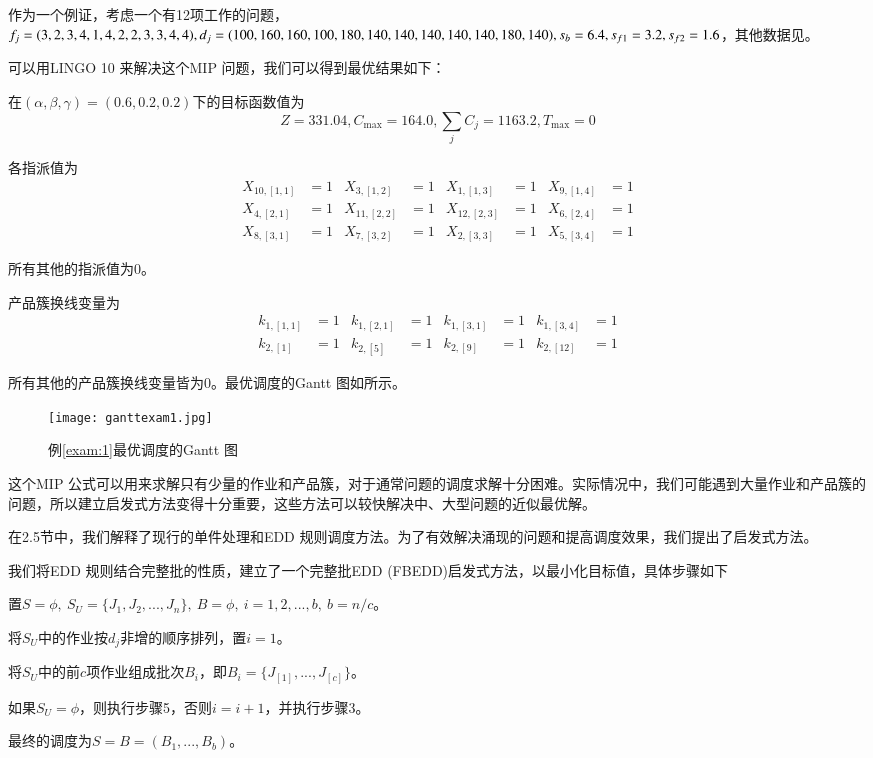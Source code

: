 \begin{example}
作为一个例证，考虑一个有12项工作的问题，$f_j=(3,2,3,4,1,4,2,2,3,3,4,4),d_j=(100,160,160,100,180,\\
140,140,140,140,140,180,140),s_b=6.4,s_{f1}=3.2,s_{f2}=1.6$，其他数据见。\label{exam:1}
\end{example}

可以用LINGO 10 来解决这个MIP 问题，我们可以得到最优结果如下：

在$(\alpha,\beta,\gamma) = (0.6,0.2,0.2)$下的目标函数值为
$$Z = 331.04, C_{\max} = 164.0, {\textstyle\sum_j C_j = 1163.2}, T_{\max} = 0$$

各指派值为
\begin{align*}
 X_{10,[1,1]} & = 1 & X_{3,[1,2]} & = 1 & X_{1,[1,3]} & = 1 & X_{9,[1,4]} & = 1\\
 X_{4,[2,1]} & = 1 & X_{11,[2,2]} & = 1 & X_{12,[2,3]} & = 1 & X_{6,[2,4]} & = 1\\
 X_{8,[3,1]} & = 1 & X_{7,[3,2]} & = 1 & X_{2,[3,3]} & = 1 & X_{5,[3,4]} & = 1
\end{align*}

所有其他的指派值为0。

产品簇换线变量为
\begin{align*}
k_{1,[1,1]} & = 1 & k_{1,[2,1]} & = 1 & k_{1,[3,1]} & = 1 & k_{1,[3,4]} & = 1 \\
k_{2,[1]} & = 1 & k_{2,[5]} & = 1 & k_{2,[9]} & = 1 & k_{2,[12]} & = 1
\end{align*}

所有其他的产品簇换线变量皆为0。最优调度的Gantt 图如所示。
\begin{figure}[h]
\texttt{[image: ganttexam1.jpg]}
\caption{例\ref{exam:1}最优调度的Gantt 图\label{fig:gantt1}}
\end{figure}

这个MIP 公式可以用来求解只有少量的作业和产品簇，对于通常问题的调度求解十分困难。实际情况中，我们可能遇到大量作业和产品簇的问题，所以建立启发式方法变得十分重要，这些方法可以较快解决中、大型问题的近似最优解。

在2.5节中，我们解释了现行的单件处理和EDD 规则调度方法。为了有效解决涌现的问题和提高调度效果，我们提出了启发式方法。
\newcommand{\Step}{{\heiti 步骤}}

我们将EDD 规则结合完整批的性质，建立了一个完整批EDD (FBEDD)启发式方法，以最小化目标值，具体步骤如下

\begin{asparaenum}
\renewcommand{\labelenumi}{\heiti 步骤\theenumi~}
\item 置$S=\phi,\ S_U = \{J_1,J_2,...,J_n\},\ B=\phi,\ i=1,2,...,b,\ b = n/c$。
\item 将$S_U$中的作业按$d_j$非增的顺序排列，置$i=1$。
\item 将$S_U$中的前$c$项作业组成批次$B_i$，即$B_i = \{J_{[1]},...,J_{[c]}\}$。
\item 如果$S_U = \phi$，则执行\Step5，否则$i=i+1$，并执行\Step 3。
\item 最终的调度为$S=B=(B_1,...,B_b)$。
\end{asparaenum}

